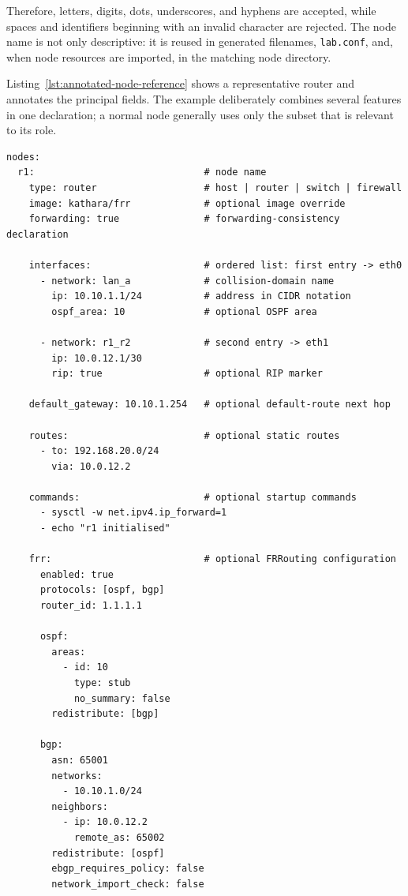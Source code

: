 Therefore, letters, digits, dots, underscores, and hyphens are accepted, while
spaces and identifiers beginning with an invalid character are rejected. The
node name is not only descriptive: it is reused in generated filenames,
\texttt{lab.conf}, and, when node resources are imported, in the matching node
directory.

Listing~\ref{lst:annotated-node-reference} shows a representative router and
annotates the principal fields. The example deliberately combines several
features in one declaration; a normal node generally uses only the subset that
is relevant to its role.

\begin{lstlisting}[caption={Annotated node configuration reference.},label={lst:annotated-node-reference}]
nodes:
  r1:                              # node name
    type: router                   # host | router | switch | firewall
    image: kathara/frr             # optional image override
    forwarding: true               # forwarding-consistency declaration

    interfaces:                    # ordered list: first entry -> eth0
      - network: lan_a             # collision-domain name
        ip: 10.10.1.1/24           # address in CIDR notation
        ospf_area: 10              # optional OSPF area

      - network: r1_r2             # second entry -> eth1
        ip: 10.0.12.1/30
        rip: true                  # optional RIP marker

    default_gateway: 10.10.1.254   # optional default-route next hop

    routes:                        # optional static routes
      - to: 192.168.20.0/24
        via: 10.0.12.2

    commands:                      # optional startup commands
      - sysctl -w net.ipv4.ip_forward=1
      - echo "r1 initialised"

    frr:                           # optional FRRouting configuration
      enabled: true
      protocols: [ospf, bgp]
      router_id: 1.1.1.1

      ospf:
        areas:
          - id: 10
            type: stub
            no_summary: false
        redistribute: [bgp]

      bgp:
        asn: 65001
        networks:
          - 10.10.1.0/24
        neighbors:
          - ip: 10.0.12.2
            remote_as: 65002
        redistribute: [ospf]
        ebgp_requires_policy: false
        network_import_check: false
\end{lstlisting}

